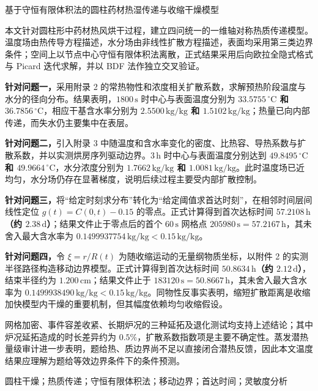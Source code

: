 \documentclass[UTF8,a4paper,zihao=-4,fontset=fandol]{ctexart}
\newcommand{\unit}[1]{\,\mathrm{#1}}
\begin{document}
\thispagestyle{empty}
\begin{center}
  {\heiti{} 基于守恒有限体积法的圆柱药材热湿传递与收缩干燥模型}
\end{center}

\vspace{0.8em}
本文针对圆柱形中药材热风烘干过程，建立四问统一的一维轴对称热质传递模型。温度场由热传导方程描述，水分场由非线性扩散方程描述，表面均采用第三类边界条件；空间上以节点中心守恒有限体积法离散，正式结果采用后向欧拉全隐式格式与 Picard 迭代求解，并以 BDF 法作独立交叉验证。

\textbf{针对问题一，}采用附录 2 的常热物性和浓度相关扩散系数，求解预热阶段温度与水分的径向分布。结果表明，$1800\unit{s}$ 时中心与表面温度分别为 \textbf{$33.5755\,^{\circ}\mathrm{C}$ 和 $36.7856\,^{\circ}\mathrm{C}$}，相应干基含水率分别为 \textbf{$2.5500\unit{kg/kg}$ 和 $1.5102\unit{kg/kg}$}；热量已向内部传递，而失水仍主要集中在表层。

\textbf{针对问题二，}引入附录 3 中随温度和含水率变化的密度、比热容、导热系数与扩散系数，并以实测烘房序列驱动边界。$3\unit{h}$ 时中心与表面温度分别达到 \textbf{$49.8495\,^{\circ}\mathrm{C}$ 和 $49.9664\,^{\circ}\mathrm{C}$}，水分浓度分别为 \textbf{$1.7662\unit{kg/kg}$ 和 $1.0081\unit{kg/kg}$}。此时温度场已近均匀，水分场仍存在显著梯度，说明后续过程主要受内部扩散控制。

\textbf{针对问题三，}将“给定时刻求分布”转化为“给定阈值求首达时刻”，在相邻时间层间线性定位 $g(t)=C(0,t)-0.15$ 的零点。正式计算得到首次达标时间 \textbf{$57.2108\unit{h}$（约 $2.38\unit{d}$）}；结果文件止于零点后的首个 $60\unit{s}$ 网格点 $205980\unit{s}=57.2167\unit{h}$，其未舍入最大含水率为 $0.1499937754\unit{kg/kg}<0.15\unit{kg/kg}$。

\textbf{针对问题四，}令 $\xi=r/R(t)$ 为随收缩运动的无量纲物质坐标，以附件 2 的实测半径路径构造移动边界模型。正式计算得到首次达标时间 \textbf{$50.8634\unit{h}$（约 $2.12\unit{d}$）}，结束半径约为 \textbf{$1.200\unit{cm}$}；结果文件止于 $183120\unit{s}=50.8667\unit{h}$，其未舍入最大含水率为 $0.1499938490\unit{kg/kg}<0.15\unit{kg/kg}$。同物性反事实表明，缩短扩散距离是收缩加快模型内干燥的重要机制，但其幅度依赖均匀收缩假设。

网格加密、事件容差收紧、长期炉况的三种延拓及退化测试均支持上述结论；其中炉况延拓造成的时长差异约为 $0.5\%$，扩散系数指数项是主要不确定性。蒸发潜热量级审计进一步表明，题给热、质边界尚不足以直接闭合潜热反馈，因此本文温度结果应理解为题给等效边界条件下的条件预测。

\vspace{0.6em}
圆柱干燥；热质传递；守恒有限体积法；移动边界；首达时间；灵敏度分析
\end{document}
